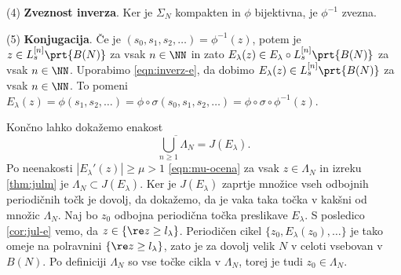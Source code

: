 \begin{dokaz}
    (4) \textbf{Zveznost inverza}. Ker je \(\Sigma_N\) kompakten in \(\phi\) bijektivna, je \(\phi^{-1}\) zvezna.

    (5) \textbf{Konjugacija}. Če je \((s_0, s_1, s_2, \dots) = \phi^{-1} (z)\), potem je \(z \in L_s^{[n]} \prt{B (N)}\) za vsak \(n \in \NN\) in zato \(E_\lambda (z) \in E_\lambda \circ L_s^{[n]} \prt{B (N)}\) za vsak \(n \in \NN\). Uporabimo \eqref{eqn:inverz-e}, da dobimo \(E_\lambda (z) \in L_s^{[n]} \prt{B (N)}\) za vsak \(n \in \NN\). To pomeni \(E_\lambda (z) = \phi (s_1, s_2, \dots) = \phi \circ \sigma (s_0, s_1, s_2, \dots) = \phi \circ \sigma \circ \phi^{-1} (z)\).
\end{dokaz}

\noindent Končno lahko dokažemo enakost
\[\overline{\bigcup_{n \geq 1} \Lambda_N} = J (E_\lambda).\]
Po neenakosti \(|E_\lambda' (z)| \geq \mu > 1\) \eqref{eqn:mu-ocena} za vsak \(z \in \Lambda_N\) in izreku \ref{thm:julm} je \(\Lambda_N \subset J (E_\lambda)\). Ker je \(J (E_\lambda)\) zaprtje množice vseh odbojnih periodičnih točk je dovolj, da dokažemo, da je vaka taka točka v kakšni od množic \(\Lambda_N\). Naj bo \(z_0\) odbojna periodična točka preslikave \(E_\lambda\). S posledico \ref{cor:jul-e} vemo, da \(z \in \{\re z \geq l_\lambda\}\). Periodičen cikel \(\{z_0, E_\lambda (z_0), \dots\}\) je tako omeje na polravnini \(\{\re z \geq l_\lambda\}\), zato je za dovolj velik \(N\) v celoti vsebovan v \(B (N)\). Po definiciji \(\Lambda_N\) so vse točke cikla v \(\Lambda_N\), torej je tudi \(z_0 \in \Lambda_N\).

